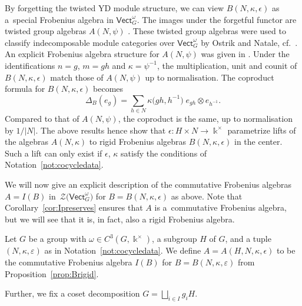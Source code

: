 \documentclass[10pt,a4paper]{amsart}
\numberwithin{equation}{section}
\newcommand{\Vect}{\mathsf{Vect}}
\newcommand{\cZ}{\mathcal{Z}}
\newcommand{\rI}{I}
\begin{document}
\begin{Remark}
By forgetting the twisted YD module structure, we can view $B(N,\kappa,\epsilon)$ as a~special Frobenius algebra in $\Vect_G^{\omega}$. The images under the forgetful functor are twisted group algebras $A(N,\psi)$ \cite{Nat,Ost}. These twisted group algebras were used to classify indecomposable module categories over $\Vect_G^\omega$ by Ostrik and Natale, cf.\ \cite[Example~9.7.2]{EGNO}. An explicit Frobenius algebra structure for $A(N,\psi)$ was given in \cite[Proposition 5.7]{WINART}.
Under the identifications $n=g$, $m=gh$ and $\kappa = \psi^{-1}$, the multiplication, unit and counit of $B(N,\kappa,\epsilon)$ match those of $A(N,\psi)$ up to normalisation.
The coproduct formula for $B(N,\kappa,\epsilon)$ becomes
\[
\Delta_B(e_g) = \sum_{h\in N} \kappa\big(gh,h^{-1}\big) \;e_{gh}\otimes e_{h^{-1}}.
\]
Compared to that of $A(N,\psi)$, the coproduct is the same, up to normalisation by $1/|N|$.
 The above results hence show that $\epsilon\colon H\times N \to \Bbbk^\times $ parametrize lifts of the algebras $A(N,\kappa)$ to rigid Frobenius algebras $B(N,\kappa,\epsilon)$ in the center. Such a lift can only exist if $\epsilon$, $\kappa$ satisfy the conditions of Notation~\ref{not:cocycledata}.
\end{Remark}

We will now give an explicit description of the commutative Frobenius algebras $A=\rI(B)$ in~$\cZ\big(\Vect_G^\omega\big)$ for $B=B(N,\kappa,\epsilon)$ as above. Note that Corollary~\ref{cor:Ipreserves} ensures that $A$ is a~commutative Frobenius algebra, but we will see that it is, in fact, also a rigid Frobenius algebra.

\begin{Definition}\label{def:A}
Let $G$ be a group with $\omega\in C^3(G,\Bbbk^\times)$, a subgroup $H$ of $G$,
and a tuple $(N,\kappa,\varepsilon)$ as in Notation~\ref{not:cocycledata}.
We define $A=A(H,N,\kappa,\epsilon)$ to be the commutative Frobenius algebra $\rI(B)$ for $B=B(N,\kappa,\varepsilon)$ from Proposition~\ref{prop:Brigid}.

Further, we fix a coset decomposition $G=\bigsqcup_{i\in I} g_i H$.
\end{Definition}
\end{document}
